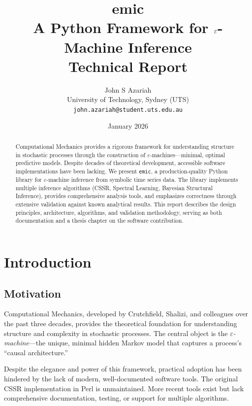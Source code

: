 \documentclass[11pt,a4paper]{report}
\title{%
    \vspace{-2em}
    {\LARGE\bfseries emic}\\[0.5em]
    {\Large A Python Framework for $\eps$-Machine Inference}\\[1em]
    {\normalsize Technical Report}
}
\author{%
    John S Azariah\\
    \small University of Technology, Sydney (UTS)\\
    \small\texttt{john.azariah@student.uts.edu.au}
}
\date{January 2026}
\theoremstyle{definition}
\theoremstyle{plain}
\newcommand{\eps}{\varepsilon}
\newcommand{\emic}{\texttt{emic}}
\begin{document}
\maketitle

\begin{abstract}
Computational Mechanics provides a rigorous framework for understanding structure in stochastic processes through the construction of $\eps$-machines—minimal, optimal predictive models. Despite decades of theoretical development, accessible software implementations have been lacking. We present \emic{}, a production-quality Python library for $\eps$-machine inference from symbolic time series data. The library implements multiple inference algorithms (CSSR, Spectral Learning, Bayesian Structural Inference), provides comprehensive analysis tools, and emphasizes correctness through extensive validation against known analytical results. This report describes the design principles, architecture, algorithms, and validation methodology, serving as both documentation and a thesis chapter on the software contribution.
\end{abstract}

\tableofcontents
\listoffigures
\listoftables

\chapter{Introduction}
\label{ch:introduction}

\section{Motivation}

Computational Mechanics, developed by Crutchfield, Shalizi, and colleagues over the past three decades, provides the theoretical foundation for understanding structure and complexity in stochastic processes. The central object is the \emph{$\eps$-machine}—the unique, minimal hidden Markov model that captures a process's ``causal architecture.''

Despite the elegance and power of this framework, practical adoption has been hindered by the lack of modern, well-documented software tools. The original CSSR implementation in Perl \cite{shalizi2004algorithm} is unmaintained. More recent tools exist but lack comprehensive documentation, testing, or support for multiple algorithms.
\end{document}
